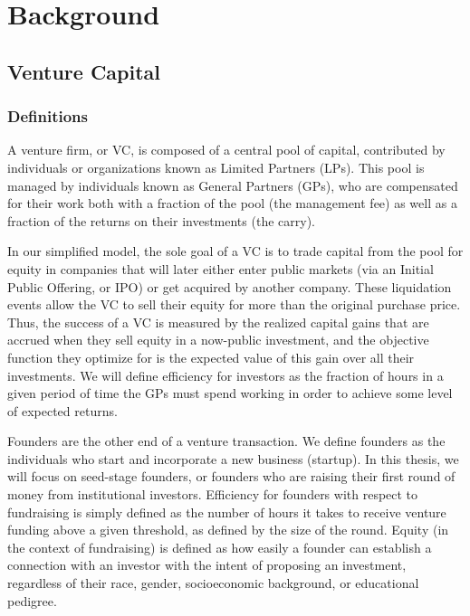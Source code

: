 \chapter{Background}

\section{Venture Capital}

\subsection{Definitions}

A venture firm, or VC, is composed of a central pool of capital, contributed by individuals or organizations known as Limited Partners (LPs). This pool is managed by individuals known as General Partners (GPs), who are compensated for their work both with a fraction of the pool (the management fee) as well as a fraction of the returns on their investments (the carry).

In our simplified model, the sole goal of a VC is to trade capital from the pool for equity in companies that will later either enter public markets (via an Initial Public Offering, or IPO) or get acquired by another company. These liquidation events allow the VC to sell their equity for more than the original purchase price. Thus, the success of a VC is measured by the realized capital gains that are accrued when they sell equity in a now-public investment, and the objective function they optimize for is the expected value of this gain over all their investments. We will define efficiency for investors as the fraction of hours in a given period of time the GPs must spend working in order to achieve some level of expected returns.

Founders are the other end of a venture transaction. We define founders as the individuals who start and incorporate a new business (startup). In this thesis, we will focus on seed-stage founders, or founders who are raising their first round of money from institutional investors. Efficiency for founders with respect to fundraising is simply defined as the number of hours it takes to receive venture funding above a given threshold, as defined by the size of the round. Equity (in the context of fundraising) is defined as how easily a founder can establish a connection with an investor with the intent of proposing an investment, regardless of their race, gender, socioeconomic background, or educational pedigree.

